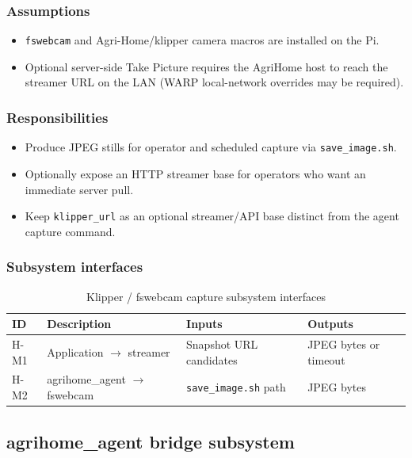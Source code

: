 \subsubsection{Assumptions}
\begin{itemize}
  \item \texttt{fswebcam} and Agri-Home/klipper camera macros are installed on the Pi.
  \item Optional server-side Take Picture requires the AgriHome host to reach the streamer URL on the LAN (WARP local-network overrides may be required).
\end{itemize}

\subsubsection{Responsibilities}
\begin{itemize}
  \item Produce JPEG stills for operator and scheduled capture via \texttt{save\_image.sh}.
  \item Optionally expose an HTTP streamer base for operators who want an immediate server pull.
  \item Keep \texttt{klipper\_url} as an optional streamer/API base distinct from the agent capture command.
\end{itemize}

\subsubsection{Subsystem interfaces}
\begin{table}[H]
\centering
\small
\begin{tabular}{|p{0.9cm}|p{3.4cm}|p{3.0cm}|p{3.5cm}|}
\hline
\textbf{ID} & \textbf{Description} & \textbf{Inputs} & \textbf{Outputs} \\
\hline
H-M1 & Application $\rightarrow$ streamer & Snapshot URL candidates & JPEG bytes or timeout \\
\hline
H-M2 & agrihome\_agent $\rightarrow$ fswebcam & \texttt{save\_image.sh} path & JPEG bytes \\
\hline
\end{tabular}
\caption{Klipper / fswebcam capture subsystem interfaces}
\end{table}

\subsection{agrihome\_agent bridge subsystem}

